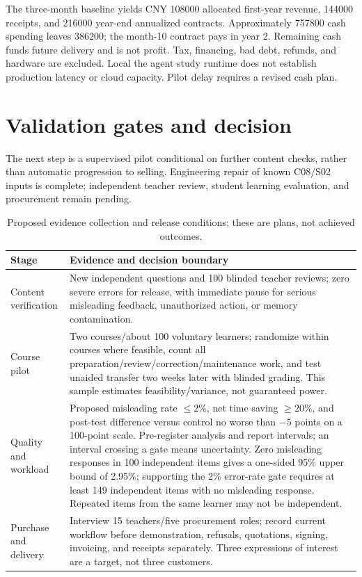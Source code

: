 The three-month baseline yields CNY 108000 allocated first-year revenue, 144000 receipts, and 216000 year-end annualized contracts. Approximately 757800 cash spending leaves 386200; the month-10 contract pays in year 2. Remaining cash funds future delivery and is not profit. Tax, financing, bad debt, refunds, and hardware are excluded. Local the agent study runtime does not establish production latency or cloud capacity. Pilot delay requires a revised cash plan.

\section{Validation gates and decision}
The next step is a supervised pilot conditional on further content checks, rather than automatic progression to selling. Engineering repair of known C08/S02 inputs is complete; independent teacher review, student learning evaluation, and procurement remain pending.

\begin{table}[htbp]\centering\small
\caption{Proposed evidence collection and release conditions; these are plans, not achieved outcomes.}\label{tab:concise-business-gates}
\begin{tabularx}{\linewidth}{@{}p{29mm}Y@{}}\toprule
Stage & Evidence and decision boundary\\\midrule
Content verification & New independent questions and 100 blinded teacher reviews; zero severe errors for release, with immediate pause for serious misleading feedback, unauthorized action, or memory contamination.\\
Course pilot & Two courses/about 100 voluntary learners; randomize within courses where feasible, count all preparation/review/correction/maintenance work, and test unaided transfer two weeks later with blinded grading. This sample estimates feasibility/variance, not guaranteed power.\\
Quality and workload & Proposed misleading rate $\leq2\%$, net time saving $\geq20\%$, and post-test difference versus control no worse than $-5$ points on a 100-point scale. Pre-register analysis and report intervals; an interval crossing a gate means uncertainty. Zero misleading responses in 100 independent items gives a one-sided 95\% upper bound of 2.95\%; supporting the 2\% error-rate gate requires at least 149 independent items with no misleading response. Repeated items from the same learner may not be independent.\\
Purchase and delivery & Interview 15 teachers/five procurement roles; record current workflow before demonstration, refusals, quotations, signing, invoicing, and receipts separately. Three expressions of interest are a target, not three customers.\\\bottomrule
\end{tabularx}
\end{table}\FloatBarrier

